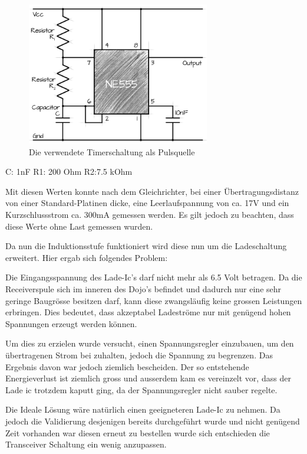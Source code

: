 \begin{figure}[H]
	\begin{center}
		\includegraphics[width=80mm]{data/Ne555circuit.png}
		\caption[Ne555]{Die verwendete Timerschaltung als Pulsquelle} %
		\label{fig:Prototyp Down}
	\end{center}
\end{figure}

\begin{center}
C: 1nF
R1: 200 Ohm
R2:7.5 kOhm
\end{center}

Mit diesen Werten konnte nach dem Gleichrichter, bei einer Übertragungsdistanz von einer Standard-Platinen dicke, eine Leerlaufspannung von ca. 17V und ein Kurzschlussstrom ca. 300mA gemessen werden. Es gilt jedoch zu beachten, dass diese Werte ohne Last gemessen wurden. 

Da nun die Induktionsstufe funktioniert wird diese nun um die Ladeschaltung erweitert. Hier ergab sich folgendes Problem:

Die Eingangsspannung des Lade-Ic’s darf nicht mehr als 6.5 Volt betragen. Da die Receiverspule sich im inneren des Dojo’s befindet und dadurch nur eine sehr geringe Baugrösse besitzen darf, kann diese zwangsläufig keine grossen Leistungen erbringen. Dies bedeutet, dass akzeptabel Ladeströme nur mit genügend hohen Spannungen erzeugt werden können.

Um dies zu erzielen wurde versucht, einen Spannungsregler einzubauen, um den übertragenen Strom bei zuhalten, jedoch die Spannung zu begrenzen. Das Ergebnis davon war jedoch ziemlich bescheiden. Der so entstehende Energieverlust ist ziemlich gross und ausserdem kam es vereinzelt vor, dass der Lade ic trotzdem kaputt ging, da der Spannungsregler nicht sauber regelte. 

Die Ideale Lösung wäre natürlich einen geeigneteren Lade-Ic zu nehmen. Da jedoch die Validierung desjenigen bereits durchgeführt wurde und nicht genügend Zeit vorhanden war diesen erneut zu bestellen wurde sich entschieden die Transceiver Schaltung ein wenig anzupassen.

